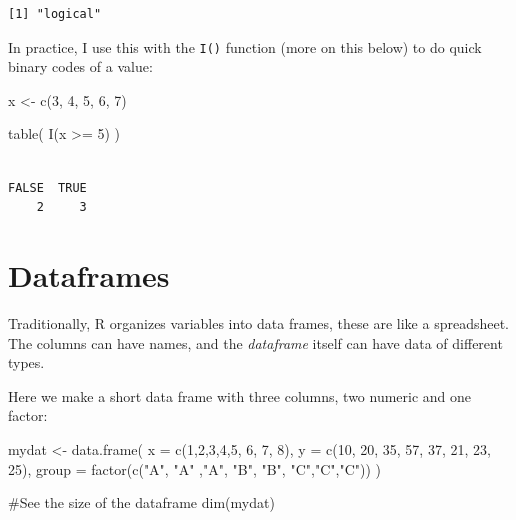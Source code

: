 \documentclass[
  letterpaper,
  DIV=11,
  numbers=noendperiod]{scrreprt}
\newenvironment{Shaded}{\begin{snugshade}}{\end{snugshade}}
\newcommand{\AttributeTok}[1]{\textcolor[rgb]{0.40,0.45,0.13}{#1}}
\newcommand{\CommentTok}[1]{\textcolor[rgb]{0.37,0.37,0.37}{#1}}
\newcommand{\DecValTok}[1]{\textcolor[rgb]{0.68,0.00,0.00}{#1}}
\newcommand{\FunctionTok}[1]{\textcolor[rgb]{0.28,0.35,0.67}{#1}}
\newcommand{\NormalTok}[1]{\textcolor[rgb]{0.00,0.23,0.31}{#1}}
\newcommand{\OtherTok}[1]{\textcolor[rgb]{0.00,0.23,0.31}{#1}}
\newcommand{\SpecialCharTok}[1]{\textcolor[rgb]{0.37,0.37,0.37}{#1}}
\newcommand{\StringTok}[1]{\textcolor[rgb]{0.13,0.47,0.30}{#1}}
\begin{document}
\begin{verbatim}
[1] "logical"
\end{verbatim}

In practice, I use this with the \texttt{I()} function (more on this
below) to do quick binary codes of a value:

\begin{Shaded}
\begin{Highlighting}[]
\NormalTok{x }\OtherTok{\textless{}{-}} \FunctionTok{c}\NormalTok{(}\DecValTok{3}\NormalTok{, }\DecValTok{4}\NormalTok{, }\DecValTok{5}\NormalTok{, }\DecValTok{6}\NormalTok{, }\DecValTok{7}\NormalTok{)}

\FunctionTok{table}\NormalTok{( }\FunctionTok{I}\NormalTok{(x }\SpecialCharTok{\textgreater{}=} \DecValTok{5}\NormalTok{) )}
\end{Highlighting}
\end{Shaded}

\begin{verbatim}

FALSE  TRUE 
    2     3 
\end{verbatim}

\hypertarget{dataframes}{%
\section{Dataframes}\label{dataframes}}

Traditionally, R organizes variables into data frames, these are like a
spreadsheet. The columns can have names, and the \emph{dataframe} itself
can have data of different types.

Here we make a short data frame with three columns, two numeric and one
factor:

\begin{Shaded}
\begin{Highlighting}[]
\NormalTok{mydat }\OtherTok{\textless{}{-}} \FunctionTok{data.frame}\NormalTok{(}
  \AttributeTok{x =} \FunctionTok{c}\NormalTok{(}\DecValTok{1}\NormalTok{,}\DecValTok{2}\NormalTok{,}\DecValTok{3}\NormalTok{,}\DecValTok{4}\NormalTok{,}\DecValTok{5}\NormalTok{, }\DecValTok{6}\NormalTok{, }\DecValTok{7}\NormalTok{, }\DecValTok{8}\NormalTok{),}
  \AttributeTok{y =} \FunctionTok{c}\NormalTok{(}\DecValTok{10}\NormalTok{, }\DecValTok{20}\NormalTok{, }\DecValTok{35}\NormalTok{, }\DecValTok{57}\NormalTok{, }\DecValTok{37}\NormalTok{, }\DecValTok{21}\NormalTok{, }\DecValTok{23}\NormalTok{, }\DecValTok{25}\NormalTok{),}
  \AttributeTok{group =} \FunctionTok{factor}\NormalTok{(}\FunctionTok{c}\NormalTok{(}\StringTok{"A"}\NormalTok{, }\StringTok{"A"}\NormalTok{ ,}\StringTok{"A"}\NormalTok{, }\StringTok{"B"}\NormalTok{, }\StringTok{"B"}\NormalTok{, }\StringTok{"C"}\NormalTok{,}\StringTok{"C"}\NormalTok{,}\StringTok{"C"}\NormalTok{))}
\NormalTok{)}

\CommentTok{\#See the size of the dataframe}
\FunctionTok{dim}\NormalTok{(mydat)}
\end{Highlighting}
\end{Shaded}
\end{document}
